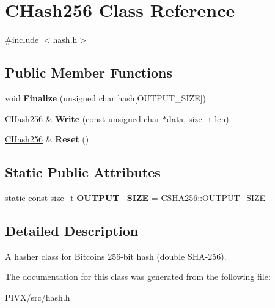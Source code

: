 \hypertarget{class_c_hash256}{}\section{C\+Hash256 Class Reference}
\label{class_c_hash256}


{\ttfamily \#include $<$hash.\+h$>$}

\subsection*{Public Member Functions}
\begin{DoxyCompactItemize}
\item 
\mbox{\label{class_c_hash256_aa8a70c1b7cf24ce7d00240a1131cf4e7}} 
void {\bfseries Finalize} (unsigned char hash\mbox{[}O\+U\+T\+P\+U\+T\+\_\+\+S\+I\+ZE\mbox{]})
\item 
\mbox{\label{class_c_hash256_a9cc25033c6435cb28e2e8e377c949a7a}} 
\mbox{\hyperlink{class_c_hash256}{C\+Hash256}} \& {\bfseries Write} (const unsigned char $\ast$data, size\+\_\+t len)
\item 
\mbox{\label{class_c_hash256_ab25b00e4cda7e209173f2ce90475953d}} 
\mbox{\hyperlink{class_c_hash256}{C\+Hash256}} \& {\bfseries Reset} ()
\end{DoxyCompactItemize}
\subsection*{Static Public Attributes}
\begin{DoxyCompactItemize}
\item 
\mbox{\label{class_c_hash256_a6812a40441acb1c3b7f10c7e38c7d467}} 
static const size\+\_\+t {\bfseries O\+U\+T\+P\+U\+T\+\_\+\+S\+I\+ZE} = C\+S\+H\+A256\+::\+O\+U\+T\+P\+U\+T\+\_\+\+S\+I\+ZE
\end{DoxyCompactItemize}


\subsection{Detailed Description}
A hasher class for Bitcoin\textquotesingle{}s 256-\/bit hash (double S\+H\+A-\/256). 

The documentation for this class was generated from the following file\+:\begin{DoxyCompactItemize}
\item 
P\+I\+V\+X/src/hash.\+h\end{DoxyCompactItemize}
